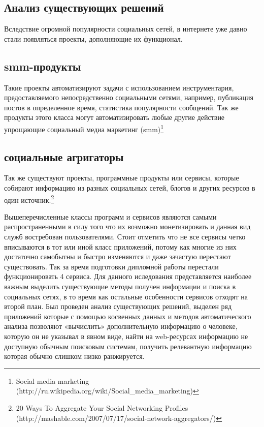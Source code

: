 \begin{chap1}
\section{Анализ существующих решений}
Вследствие огромной популярности социальных сетей, в интернете уже давно стали появляться проекты, дополняющие их функционал. 
\subsection{smm-продукты}
Такие проекты автоматизируют задачи с использованием инструментария, предоставляемого непосредственно социальными сетями, например, публикация постов в определенное время, статистика популярности сообщений. Так же продукты этого класса могут автоматизировать любые другие действие упрощающие социальный медиа маркетинг (smm)\footnote{Social media marketing (http://ru.wikipedia.org/wiki/Social_media_marketing)}
\subsection{социальные агригаторы}
Так же существуют проекты, программные продукты или сервисы, которые собирают информацию из разных социальных сетей, блогов и других ресурсов в один источник.\footnote{20 Ways To Aggregate Your Social Networking Profiles (http://mashable.com/2007/07/17/social-network-aggregators/)} 

Вышеперечисленные классы программ и сервисов являются самыми распространенными в силу того что их возможно монетизировать %
 и данная вид служб востребован пользователями. Стоит отметить что не все сервисы четко вписываются в тот или иной класс приложений, потому как многие из них достаточно самобытны и быстро изменяются и даже зачастую перестают существовать. Так за время подготовки дипломной работы перестали функционировать 4 сервиса. Для данного иследования представляется наиболее важным выделить существующие методы получен информации и поиска в социальных сетях, в то время как остальные особенности сервисов отходят на второй план. Был проведен анализ существующих решений, выделен ряд приложений которые с помощью косвенных данных и методов автоматического анализа позволяют «вычислить» дополнительную информацию о человеке, которую он не указывал в явном виде, найти на web-ресурсах информацию не доступную обычным поисковым системам, получить релевантную информацию которая обычно слишком низко ранжируется. %

\end{chap1}
